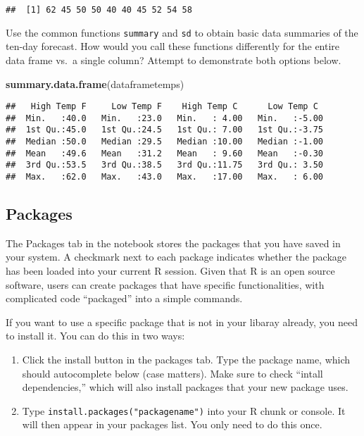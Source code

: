 \documentclass[]{article}
\newenvironment{Shaded}{\begin{snugshade}}{\end{snugshade}}
\newcommand{\KeywordTok}[1]{\textcolor[rgb]{0.13,0.29,0.53}{\textbf{#1}}}
\newcommand{\DataTypeTok}[1]{\textcolor[rgb]{0.13,0.29,0.53}{#1}}
\newcommand{\StringTok}[1]{\textcolor[rgb]{0.31,0.60,0.02}{#1}}
\newcommand{\OperatorTok}[1]{\textcolor[rgb]{0.81,0.36,0.00}{\textbf{#1}}}
\newcommand{\NormalTok}[1]{#1}
\begin{document}
\begin{Shaded}
\end{Shaded}

\begin{verbatim}
##  [1] 62 45 50 50 40 40 45 52 54 58
\end{verbatim}

Use the common functions \texttt{summary} and \texttt{sd} to obtain
basic data summaries of the ten-day forecast. How would you call these
functions differently for the entire data frame vs.~a single column?
Attempt to demonstrate both options below.

\begin{Shaded}
\begin{Highlighting}[]
\KeywordTok{summary.data.frame}\NormalTok{(dataframetemps)}
\end{Highlighting}
\end{Shaded}

\begin{verbatim}
##   High Temp F     Low Temp F    High Temp C      Low Temp C   
##  Min.   :40.0   Min.   :23.0   Min.   : 4.00   Min.   :-5.00  
##  1st Qu.:45.0   1st Qu.:24.5   1st Qu.: 7.00   1st Qu.:-3.75  
##  Median :50.0   Median :29.5   Median :10.00   Median :-1.00  
##  Mean   :49.6   Mean   :31.2   Mean   : 9.60   Mean   :-0.30  
##  3rd Qu.:53.5   3rd Qu.:38.5   3rd Qu.:11.75   3rd Qu.: 3.50  
##  Max.   :62.0   Max.   :43.0   Max.   :17.00   Max.   : 6.00
\end{verbatim}

\subsection{Packages}\label{packages}

The Packages tab in the notebook stores the packages that you have saved
in your system. A checkmark next to each package indicates whether the
package has been loaded into your current R session. Given that R is an
open source software, users can create packages that have specific
functionalities, with complicated code ``packaged'' into a simple
commands.

If you want to use a specific package that is not in your libaray
already, you need to install it. You can do this in two ways:

\begin{enumerate}
\def\labelenumi{\arabic{enumi}.}
\item
  Click the install button in the packages tab. Type the package name,
  which should autocomplete below (case matters). Make sure to check
  ``intall dependencies,'' which will also install packages that your
  new package uses.
\item
  Type \texttt{install.packages("packagename")} into your R chunk or
  console. It will then appear in your packages list. You only need to
  do this once.
\end{enumerate}
\end{document}
